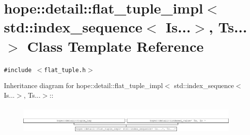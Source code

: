 \hypertarget{classhope_1_1detail_1_1flat__tuple__impl_3_01std_1_1index__sequence_3_01_is_8_8_8_4_00_01_ts_8_8_8_4}{
\section{hope::detail::flat\_\-tuple\_\-impl$<$ std::index\_\-sequence$<$ Is...$>$, Ts...$>$ Class Template Reference}
\label{classhope_1_1detail_1_1flat__tuple__impl_3_01std_1_1index__sequence_3_01_is_8_8_8_4_00_01_ts_8_8_8_4}
}
{\tt \#include $<$flat\_\-tuple.h$>$}

Inheritance diagram for hope::detail::flat\_\-tuple\_\-impl$<$ std::index\_\-sequence$<$ Is...$>$, Ts...$>$::\begin{figure}[H]
\begin{center}
\leavevmode
\includegraphics[height=1.48936cm]{classhope_1_1detail_1_1flat__tuple__impl_3_01std_1_1index__sequence_3_01_is_8_8_8_4_00_01_ts_8_8_8_4}
\end{center}
\end{figure}
